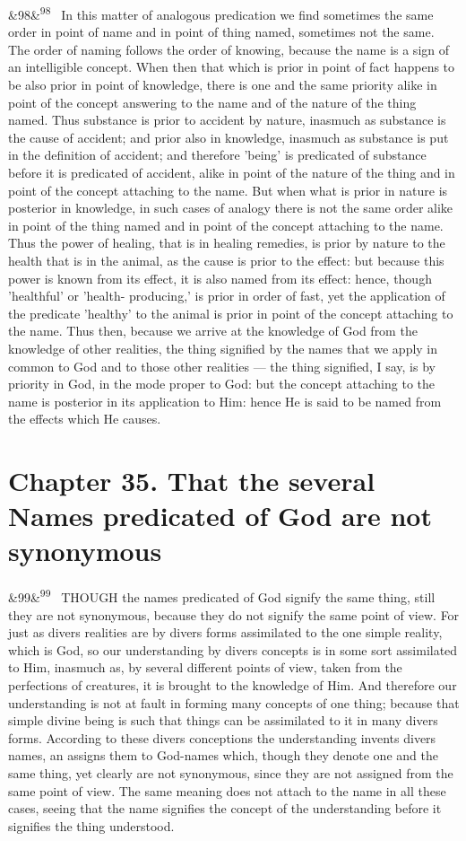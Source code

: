 \documentclass[12pt]{article}
\newcommand{\para}[1][]{\par\noindent\ifx&#1&\else\textsuperscript{\footnotesize #1}~\fi}
\begin{document}
\para[98] In this matter of analogous predication we find sometimes the same order in point of name and in point of thing named, sometimes not the same. The order of naming follows the order of knowing, because the name is a sign of an intelligible concept. When then that which is prior in point of fact happens to be also prior in point of knowledge, there is one and the same priority alike in point of the concept answering to the name and of the nature of the thing named. Thus substance is prior to accident by nature, inasmuch as substance is the cause of accident; and prior also in knowledge, inasmuch as substance is put in the definition of accident; and therefore 'being' is predicated of substance before it is predicated of accident, alike in point of the nature of the thing and in point of the concept attaching to the name. But when what is prior in nature is posterior in knowledge, in such cases of analogy there is not the same order alike in point of the thing named and in point of the concept attaching to the name. Thus the power of healing, that is in healing remedies, is prior by nature to the health that is in the animal, as the cause is prior to the effect: but because this power is known from its effect, it is also named from its effect: hence, though 'healthful' or 'health- producing,' is prior in order of fast, yet the application of the predicate 'healthy' to the animal is prior in point of the concept attaching to the name. Thus then, because we arrive at the knowledge of God from the knowledge of other realities, the thing signified by the names that we apply in common to God and to those other realities --- the thing signified, I say, is by priority in God, in the mode proper to God: but the concept attaching to the name is posterior in its application to Him: hence He is said to be named from the effects which He causes.

\section*{Chapter 35. That the several Names predicated of God are not synonymous}

\para[99] THOUGH the names predicated of God signify the same thing, still they are not synonymous, because they do not signify the same point of view. For just as divers realities are by divers forms assimilated to the one simple reality, which is God, so our understanding by divers concepts is in some sort assimilated to Him, inasmuch as, by several different points of view, taken from the perfections of creatures, it is brought to the knowledge of Him. And therefore our understanding is not at fault in forming many concepts of one thing; because that simple divine being is such that things can be assimilated to it in many divers forms. According to these divers conceptions the understanding invents divers names, an assigns them to God-names which, though they denote one and the same thing, yet clearly are not synonymous, since they are not assigned from the same point of view. The same meaning does not attach to the name in all these cases, seeing that the name signifies the concept of the understanding before it signifies the thing understood.
\end{document}
